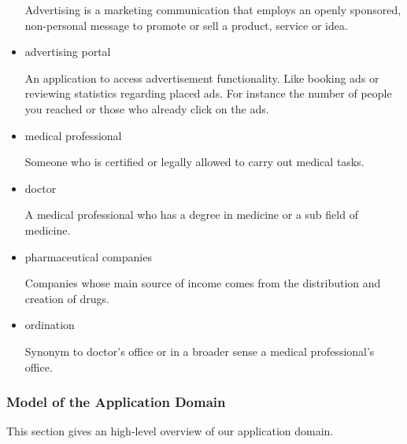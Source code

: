 \documentclass[12pt]{article}
\theoremstyle{definition}
\begin{document}
\begin{itemize}
    Advertising is a marketing communication that employs an openly sponsored, non-personal message to promote or sell a product, service or idea.
    
    \item advertising portal
    
    An application to access advertisement functionality. Like booking ads or reviewing statistics regarding placed ads. For instance the number of people you reached or those who already click on the ads.
    
    \item medical professional
    
    Someone who is certified or legally allowed to carry out medical tasks.
    
    \item doctor
    
    A medical professional who has a degree in medicine or a sub field of medicine.
    
    \item pharmaceutical companies
    
    Companies whose main source of income comes from the distribution and creation of drugs.
    
    \item ordination
    
    Synonym to doctor's office or in a broader sense a medical professional's office.
    
\end{itemize}

\subsubsection{Model of the Application Domain}

This section gives an high-level overview of our application domain.
\end{document}
